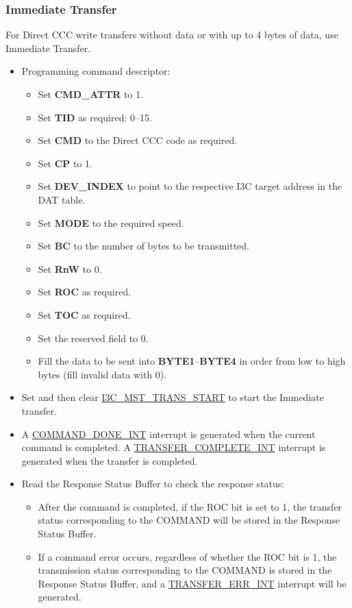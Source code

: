 \documentclass[main\_\_EN.tex]{subfiles}
\begin{document}
\subsubsection{Immediate Transfer}
For Direct CCC write transfers without data or with up to 4 bytes of data, use Immediate Transfer.

\begin{itemize}
    \item Programming command descriptor:
    \begin{itemize}
        \item Set \textbf{CMD\_ATTR} to 1.
        \item Set \textbf{TID} as required: 0–15.
        \item Set \textbf{CMD} to the Direct CCC code as required.
        \item Set \textbf{CP} to 1.
        \item Set \textbf{DEV\_INDEX} to point to the respective I3C target address in the DAT table.
        \item Set \textbf{MODE} to the required speed.
        \item Set \textbf{BC} to the number of bytes to be transmitted.
        \item Set \textbf{RnW} to 0.
        \item Set \textbf{ROC} as required.
        \item Set \textbf{TOC} as required.
        \item Set the reserved field to 0.
        \item Fill the data to be sent into \textbf{BYTE1}–\textbf{BYTE4} in order from low to high bytes (fill invalid data with 0).
    \end{itemize}
    \item Set and then clear \hyperref[fielddesc:I3CMSTREGTRANSSTART]{I3C\_MST\_TRANS\_START} to start the Immediate transfer.
    \item A \hyperref[int:COMMANDDONEINT]{COMMAND\_DONE\_INT} interrupt is generated when the current command is completed. A \hyperref[int:TRANSFERCOMPLETEINT]{TRANSFER\_COMPLETE\_INT} interrupt is generated when the transfer is completed.
    \item Read the Response Status Buffer to check the response status:
    \begin{itemize}
        \item After the command is completed, if the ROC bit is set to 1, the transfer status corresponding to the COMMAND will be stored in the Response Status Buffer.
        \item If a command error occurs, regardless of whether the ROC bit is 1, the transmission status corresponding to the COMMAND is stored in the Response Status Buffer, and a \hyperref[int:TRANSFERERRINT]{TRANSFER\_ERR\_INT} interrupt will be generated.
    \end{itemize}
\end{itemize}
\end{document}
